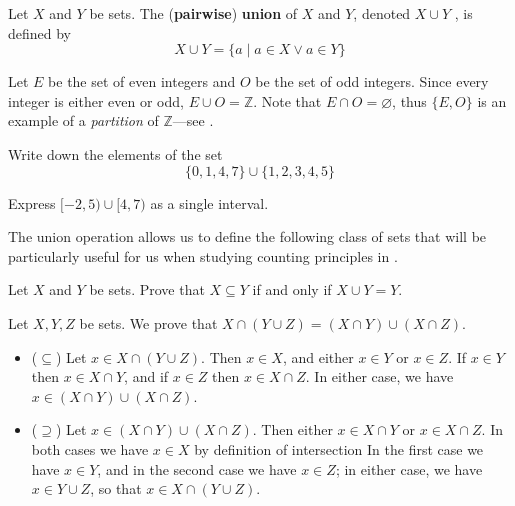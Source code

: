 \begin{definition}
Let $X$ and $Y$ be sets. The (\textbf{pairwise}) \textbf{union} of $X$ and $Y$, denoted $X \cup Y$ , is defined by
\[ X \cup Y = \{ a \mid a \in X \vee a \in Y \} \]
\end{definition}

\begin{example}
Let $E$ be the set of even integers and $O$ be the set of odd integers. Since every integer is either even or odd, $E \cup O = \mathbb{Z}$. Note that $E \cap O = \varnothing$, thus $\{E,O\}$ is an example of a \textit{partition} of $\mathbb{Z}$---see .
\end{example}

\begin{exercise}
Write down the elements of the set
\[ \{ 0, 1, 4, 7 \} \cup \{ 1, 2, 3, 4, 5 \} \]
\end{exercise}

\begin{exercise}
Express $[-2,5) \cup [4,7)$ as a single interval.
\end{exercise}

The union operation allows us to define the following class of sets that will be particularly useful for us when studying counting principles in .

\begin{exercise}
Let $X$ and $Y$ be sets. Prove that $X \subseteq Y$ if and only if $X \cup Y = Y$.
\end{exercise}

\begin{example}
\label{exIntersectionDistributesOverUnion}
Let $X,Y,Z$ be sets. We prove that $X \cap (Y \cup Z) = (X \cap Y) \cup (X \cap Z)$.
\begin{itemize}
\item ($\subseteq$) Let $x \in X \cap (Y \cup Z)$. Then $x \in X$, and either $x \in Y$ or $x \in Z$. If $x \in Y$ then $x \in X \cap Y$, and if $x \in Z$ then $x \in X \cap Z$. In either case, we have $x \in (X \cap Y) \cup (X \cap Z)$.
\item ($\supseteq$) Let $x \in (X \cap Y) \cup (X \cap Z)$. Then either $x \in X \cap Y$ or $x \in X \cap Z$. In both cases we have $x \in X$ by definition of intersection 
In the first case we have $x \in Y$, and in the second case we have $x \in Z$; in either case, we have $x \in Y \cup Z$, so that $x \in X \cap (Y \cup Z)$.
\end{itemize}
\end{example}

